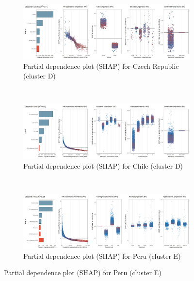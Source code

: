 \begin{figure}[ht!]\ContinuedFloat
    \centering
   \begin{subfigure}[b]{\textwidth}
         \centering
         \caption{Partial dependence plot (SHAP) for Czech Republic (cluster D)}
         \label{fig:5b_CZE}
         \includegraphics[width=\textwidth]{Figure 5b/Figure_5b_CZE}         
     \end{subfigure}
    \\
    \vspace{0.5cm}
   \begin{subfigure}[b]{\textwidth}
         \centering
         \caption{Partial dependence plot (SHAP) for Chile (cluster D)}
         \label{fig:5b_CHL}
         \includegraphics[width=\textwidth]{Figure 5b/Figure_5b_CHL}         
     \end{subfigure}
    \\
    \vspace{0.5cm}
   \begin{subfigure}[b]{\textwidth}
         \centering
         \caption{Partial dependence plot (SHAP) for Peru (cluster E)}
         \label{fig:5b_PER}
         \includegraphics[width=\textwidth]{Figure 5b/Figure_5b_PER}

\end{subfigure}
\end{figure}
